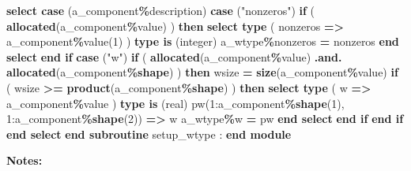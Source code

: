 \documentclass[
  paper=a4,
  ,captions=tableheading
]{scrartcl}
\newenvironment{Shaded}{\begin{snugshade}}{\end{snugshade}}
\newcommand{\DataTypeTok}[1]{\textcolor[rgb]{0.13,0.29,0.53}{#1}}
\newcommand{\DecValTok}[1]{\textcolor[rgb]{0.00,0.00,0.81}{#1}}
\newcommand{\FunctionTok}[1]{\textcolor[rgb]{0.13,0.29,0.53}{\textbf{#1}}}
\newcommand{\KeywordTok}[1]{\textcolor[rgb]{0.13,0.29,0.53}{\textbf{#1}}}
\newcommand{\NormalTok}[1]{#1}
\newcommand{\OperatorTok}[1]{\textcolor[rgb]{0.81,0.36,0.00}{\textbf{#1}}}
\newcommand{\StringTok}[1]{\textcolor[rgb]{0.31,0.60,0.02}{#1}}
\begin{document}
\begin{Shaded}
\begin{Highlighting}[]
    \KeywordTok{select case}\NormalTok{ (a\_component}\OperatorTok{\%}\NormalTok{description)}
     \KeywordTok{case}\NormalTok{ (}\StringTok{"nonzeros"}\NormalTok{)}
      \KeywordTok{if}\NormalTok{ ( }\FunctionTok{allocated}\NormalTok{(a\_component}\OperatorTok{\%}\DataTypeTok{value}\NormalTok{) ) }\KeywordTok{then}
        \KeywordTok{select type}\NormalTok{ ( nonzeros }\KeywordTok{=}\OperatorTok{\textgreater{}}\NormalTok{ a\_component}\OperatorTok{\%}\DataTypeTok{value}\NormalTok{(}\DecValTok{1}\NormalTok{) )}
         \KeywordTok{type is}\NormalTok{ (}\DataTypeTok{integer}\NormalTok{)}
\NormalTok{          a\_wtype}\OperatorTok{\%}\NormalTok{nonzeros }\KeywordTok{=}\NormalTok{ nonzeros}
        \KeywordTok{end select}
      \KeywordTok{end if}
     \KeywordTok{case}\NormalTok{ (}\StringTok{"w"}\NormalTok{)}
      \KeywordTok{if}\NormalTok{ ( }\FunctionTok{allocated}\NormalTok{(a\_component}\OperatorTok{\%}\DataTypeTok{value}\NormalTok{) }\OperatorTok{.and.} \FunctionTok{allocated}\NormalTok{(a\_component}\OperatorTok{\%}\FunctionTok{shape}\NormalTok{) ) }\KeywordTok{then}
\NormalTok{        wsize }\KeywordTok{=} \FunctionTok{size}\NormalTok{(a\_component}\OperatorTok{\%}\DataTypeTok{value}\NormalTok{)}
        \KeywordTok{if}\NormalTok{ ( wsize }\OperatorTok{\textgreater{}=} \FunctionTok{product}\NormalTok{(a\_component}\OperatorTok{\%}\FunctionTok{shape}\NormalTok{) ) }\KeywordTok{then}
          \KeywordTok{select type}\NormalTok{ ( w }\KeywordTok{=}\OperatorTok{\textgreater{}}\NormalTok{ a\_component}\OperatorTok{\%}\DataTypeTok{value}\NormalTok{ )}
           \KeywordTok{type is}\NormalTok{ (}\DataTypeTok{real}\NormalTok{)}
\NormalTok{            pw(}\DecValTok{1}\NormalTok{:a\_component}\OperatorTok{\%}\FunctionTok{shape}\NormalTok{(}\DecValTok{1}\NormalTok{), }\DecValTok{1}\NormalTok{:a\_component}\OperatorTok{\%}\FunctionTok{shape}\NormalTok{(}\DecValTok{2}\NormalTok{)) }\KeywordTok{=}\OperatorTok{\textgreater{}}\NormalTok{ w}
\NormalTok{            a\_wtype}\OperatorTok{\%}\NormalTok{w }\KeywordTok{=}\NormalTok{ pw}
          \KeywordTok{end select}
        \KeywordTok{end if}
      \KeywordTok{end if}
    \KeywordTok{end select}
  \KeywordTok{end subroutine}\NormalTok{ setup\_wtype}
\NormalTok{  :}
\KeywordTok{end module}
\end{Highlighting}
\end{Shaded}

\textbf{Notes:}
\end{document}
